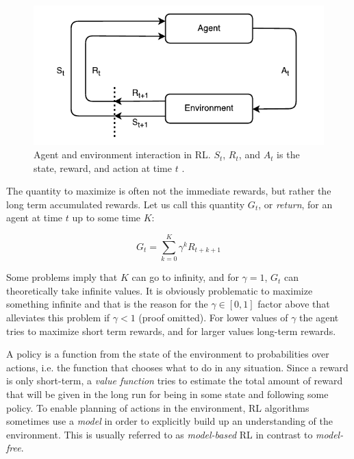 \begin{figure}[h]
    \centering
    \includegraphics[]{res/agent_environment_interaction.pdf}

    \caption{Agent and environment interaction in RL. $S_t$, $R_t$, and $A_t$
             is the state, reward, and action at time $t$ \cite{sutton1998reinforcement}.}

    \label{fig:rl_flowchart}
\end{figure}

The quantity to maximize is often not the immediate rewards, but rather the
long term accumulated rewards. Let us call this quantity $G_t$, or
\textit{return}, for an agent at time $t$ up to some time $K$:

\begin{equation}
    G_t = \sum_{k=0}^K \gamma^k R_{t+k+1}
\end{equation}

Some problems imply that $K$ can go to infinity, and for $\gamma = 1$, $G_t$
can theoretically take infinite values. It is obviously problematic to maximize
something infinite and that is the reason for the $\gamma \in \left[0,
1\right]$ factor above that alleviates this problem if $\gamma < 1$ (proof
omitted). For lower values of $\gamma$ the agent tries to maximize short term
rewards, and for larger values long-term rewards. 

A policy is a function from the state of the environment to probabilities over
actions, i.e. the function that chooses what to do in any situation. Since a
reward is only short-term, a \textit{value function} tries to estimate the
total amount of reward that will be given in the long run for being in some
state and following some policy. To enable planning of actions in the
environment, RL algorithms sometimes use a \textit{model} in order to
explicitly build up an understanding of the environment. This is usually
referred to as \textit{model-based} RL in contrast to \textit{model-free}.

